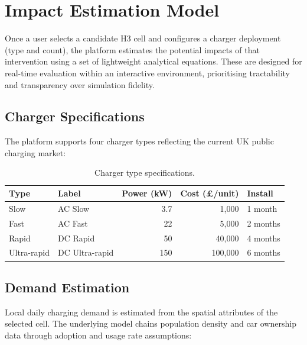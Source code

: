 \section{Impact Estimation Model}
\label{sec:impact}

Once a user selects a candidate H3 cell and configures a charger deployment (type and count), the platform estimates the potential impacts of that intervention using a set of lightweight analytical equations. These are designed for real-time evaluation within an interactive environment, prioritising tractability and transparency over simulation fidelity.

\subsection{Charger Specifications}
\label{sec:charger-specs}

The platform supports four charger types reflecting the current UK public charging market:

\begin{table}[htbp]
\centering
\caption{Charger type specifications.}
\label{tab:charger-specs}
\small
\begin{tabular}{llrrl}
\toprule
\textbf{Type} & \textbf{Label} & \textbf{Power (kW)} & \textbf{Cost (\pounds/unit)} & \textbf{Install} \\
\midrule
Slow & AC Slow & 3.7 & 1{,}000 & 1 month \\
Fast & AC Fast & 22 & 5{,}000 & 2 months \\
Rapid & DC Rapid & 50 & 40{,}000 & 4 months \\
Ultra-rapid & DC Ultra-rapid & 150 & 100{,}000 & 6 months \\
\bottomrule
\end{tabular}
\end{table}

\subsection{Demand Estimation}
\label{sec:demand}

Local daily charging demand is estimated from the spatial attributes of the selected cell. The underlying model chains population density and car ownership data through adoption and usage rate assumptions:

